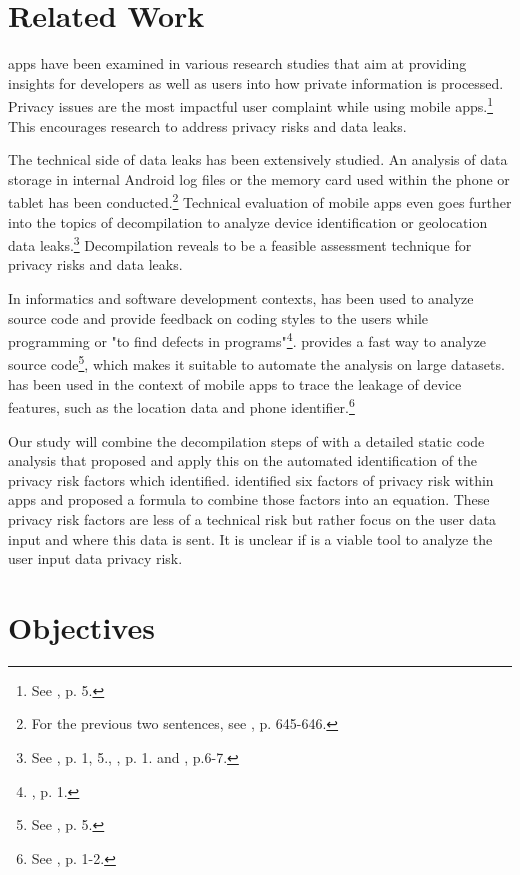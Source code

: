 \documentclass[
	a4paper,
	oneside,
	12pt,
	liststotocnumbered
]{article}
\let\cite\textcite
\begin{document}
\section{Related Work}
\mH apps have been examined in various research studies that aim at providing insights for developers as well as users into how private information is processed.
Privacy issues are the most impactful user complaint while using mobile apps.\footnote{See \cite{Khalid2015}, p. 5.}
This encourages research to address privacy risks and data leaks.

The technical side of data leaks has been extensively studied. 
An analysis of \mH data storage in internal Android log files or the memory card used within the phone or tablet has been conducted.\footnote{For the previous two sentences, see \cite{He2014}, p. 645-646.}
Technical evaluation of mobile apps even goes further into the topics of decompilation to analyze device identification or geolocation data leaks.\footnote{See \cite{Mcclurg2012}, p. 1, 5., \cite{Enck2011}, p. 1. and \cite{Mitchell2013}, p.6-7.}
Decompilation reveals to be a feasible assessment technique for privacy risks and data leaks.

In informatics and software development contexts, \sca has been used to analyze source code and provide feedback on coding styles to the users  while programming or "to find defects in programs"\footnote{\cite{Bardas2010}, p. 1.}.
\Sca provides a fast way to analyze source code\footnote{See \cite{Bardas2010}, p. 5.}, which makes it suitable to automate the analysis on large datasets.
\Sca has been used in the context of mobile apps to trace the leakage of device features, such as the location data and phone identifier.\footnote{See \cite{Kim2012}, p. 1-2.}

Our study will combine the decompilation steps of \cite{Enck2011} with a detailed static code analysis that \cite{Kim2012} proposed and apply this on the automated identification of the privacy risk factors which \cite{Bruggemann2016} identified.
\cite{Bruggemann2016} identified six factors of privacy risk within \mH apps and proposed a formula to combine those factors into an equation.
These privacy risk factors are less of a technical risk but rather focus on the user data input and where this data is sent.
It is unclear if \sca is a viable tool to analyze the user input data privacy risk.

\section{Objectives}
\end{document}
